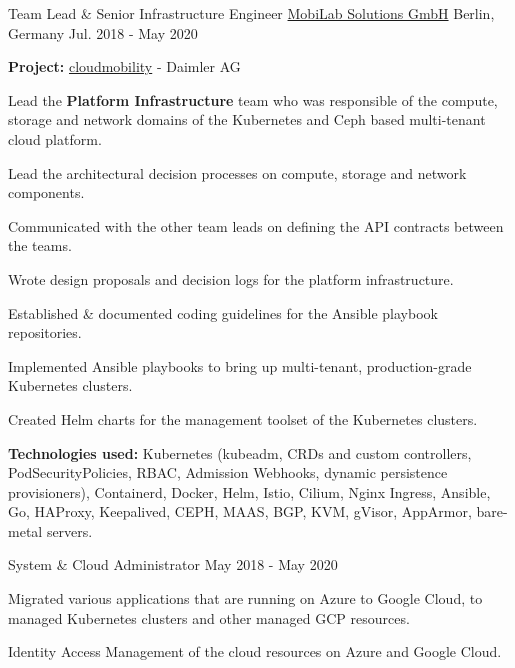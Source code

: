 \begin{cventries}
    \cventry
    {Team Lead \& Senior Infrastructure Engineer}
    {\href{https://mobilabsolutions.com/}{MobiLab Solutions GmbH}}
    {Berlin, Germany}
    {Jul. 2018 - May 2020}
    {
    \begin{cvitems}
        \item {\textbf{Project:} \href{https://cloudmobility.io}{cloudmobility} - Daimler AG}
        \newline
        \item {Lead the \textbf{Platform Infrastructure} team who was responsible of the compute,
        storage and network domains of the Kubernetes and Ceph based multi-tenant cloud platform.}
        \item {Lead the architectural decision processes on compute, storage and network components.}
        \item {Communicated with the other team leads on defining the API contracts between the teams.}
        \item {Wrote design proposals and decision logs for the platform infrastructure.}
        \item {Established \& documented coding guidelines for the Ansible playbook repositories.}
        \item {Implemented Ansible playbooks to bring up multi-tenant, production-grade Kubernetes clusters.}
        \item {Created Helm charts for the management toolset of the Kubernetes clusters.}
        \smallskip
        \item {
        \textbf{Technologies used:} Kubernetes (kubeadm, CRDs and custom controllers,
        PodSecurityPolicies, RBAC, Admission Webhooks, dynamic persistence provisioners),
        Containerd, Docker, Helm, Istio, Cilium, Nginx Ingress, Ansible, Go,
        HAProxy, Keepalived, CEPH, MAAS, BGP, KVM, gVisor, AppArmor, bare-metal servers.
        }
    \end{cvitems}
    }

    \cventry
    {System \& Cloud Administrator}
    {}
    {}
    {May 2018 - May 2020}
    {
    \begin{cvitems}
        \item {
        Migrated various applications that are running on Azure to Google Cloud,
        to managed Kubernetes clusters and other managed GCP resources.
        }
        \item {Identity Access Management of the cloud resources on Azure and Google Cloud.}
    \end{cvitems}
    }


\end{cventries}

